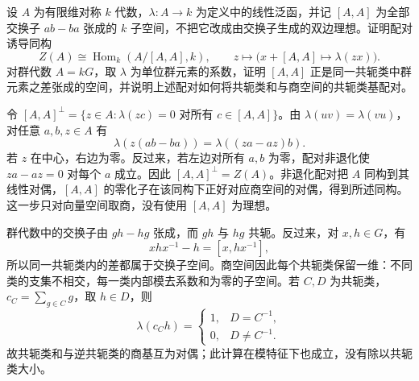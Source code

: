 \begin{optionalexercise}\label{b5:ex:08-symmetric-center-dual}
	设 \(A\) 为有限维对称 \(k\) 代数，\(\lambda:A\to k\) 为定义中的线性泛函，并记 \([A,A]\) 为全部交换子 \(ab-ba\) 张成的 \(k\) 子空间，不把它改成由交换子生成的双边理想。证明配对诱导同构
	\[
		Z(A)\cong\operatorname{Hom}_k(A/[A,A],k),
		\qquad z\longmapsto\bigl(x+[A,A]\mapsto\lambda(zx)\bigr).
	\]
	对群代数 \(A=kG\)，取 \(\lambda\) 为单位群元素的系数，证明 \([A,A]\) 正是同一共轭类中群元素之差张成的空间，并说明上述配对如何将共轭类和与商空间的共轭类基配对。
\end{optionalexercise}
\begin{solution}
	令 \([A,A]^\perp=\{z\in A:\lambda(zc)=0\text{ 对所有 }c\in[A,A]\}\)。由 \(\lambda(uv)=\lambda(vu)\)，对任意 \(a,b,z\in A\) 有
	\[
		\lambda(z(ab-ba))=\lambda((za-az)b).
	\]
	若 \(z\) 在中心，右边为零。反过来，若左边对所有 \(a,b\) 为零，配对非退化使 \(za-az=0\) 对每个 \(a\) 成立。因此 \([A,A]^\perp=Z(A)\)。非退化配对把 \(A\) 同构到其线性对偶，\([A,A]\) 的零化子在该同构下正好对应商空间的对偶，得到所述同构。这一步只对向量空间取商，没有使用 \([A,A]\) 为理想。

	群代数中的交换子由 \(gh-hg\) 张成，而 \(gh\) 与 \(hg\) 共轭。反过来，对 \(x,h\in G\)，有
	\[
		xhx^{-1}-h=[x,hx^{-1}],
	\]
	所以同一共轭类内的差都属于交换子空间。商空间因此每个共轭类保留一维：不同类的支集不相交，每一类内部模去系数和为零的子空间。若 \(C,D\) 为共轭类，\(c_C=\sum_{g\in C}g\)，取 \(h\in D\)，则
	\[
		\lambda(c_Ch)=
		\begin{cases}1,&D=C^{-1},\\0,&D\ne C^{-1}.
		\end{cases}
	\]
	故共轭类和与逆共轭类的商基互为对偶；此计算在模特征下也成立，没有除以共轭类大小。
\end{solution}


